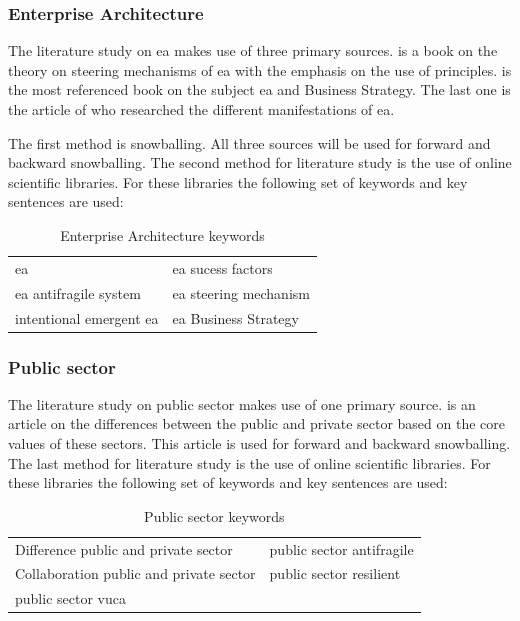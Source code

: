 \subsubsection{Enterprise Architecture}
\label{subsub:enterprisearchitecture}
The literature study on \acrshort{ea} makes use of three primary sources. \textcite{Greefhorst2011} is a book on the theory on steering mechanisms of \acrshort{ea} with the emphasis on the use of principles. \textcite{Ross2014} is the most referenced book on the subject \acrshort{ea} and Business Strategy. The last one is the article of \textcite{Lapalme2012} who researched the different manifestations of \acrshort{ea}.

The first method is snowballing. All three sources will be used for forward and backward snowballing. The second method for literature study is the use of online scientific libraries. For these libraries the following set of keywords and key sentences are used:
\bigskip

\begin{table}[H]
	\centering
\begin{tabular}{p{}p{}}
	\toprule
	\acrlong{ea} & \acrlong{ea} sucess factors\\%
	\acrlong{ea} \gls{antifragile} system	& \acrlong{ea} steering mechanism\\%
	intentional emergent \acrlong{ea} & \acrlong{ea} Business Strategy\\%
	\bottomrule
\end{tabular}
	\caption{Enterprise Architecture keywords}
\end{table}

\subsubsection{Public sector}
\label{subsub:publicsector}
The literature study on public sector makes use of one primary source. \textcite{Wal2008} is an article on the differences between the public and private sector based on the core values of these sectors. This article is used for forward and backward snowballing. The last method for literature study is the use of online scientific libraries. For these libraries the following set of keywords and key sentences are used:
\bigskip

\begin{table}[H]
	\centering
	\begin{tabular}{p{}p{}}
		\toprule
		Difference public and private sector &	public sector \gls{antifragile}\\%
		Collaboration public and private sector & public sector \gls{resilient}\\%
		public sector \acrshort{vuca} & \\%
		\bottomrule
	\end{tabular}
	\caption{Public sector keywords}
\end{table}

